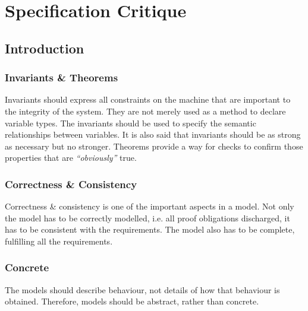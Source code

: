 
\def\mytitle{Specification Critique}
\def\myauthor{Group 03}
\def\email{se2020.grp03@cse.unsw.edu.au}
\def\mydate{05 August 2012}
\def\latexmode{article}

 \pagebreak 

 \tableofcontents 

 \pagebreak 

\chapter{Specification Critique}
\label{specificationcritique}

\section{Introduction}
\label{introduction}

\subsection{Invariants \& Theorems}
\label{invariantstheorems}

Invariants should express all constraints on the machine that are important to the integrity of the system. They are not merely used as a method to declare variable types. The invariants should be used to specify the semantic relationships between variables. It is also said that invariants should be as strong as necessary but no stronger. Theorems provide a way for checks to confirm those properties that are \emph{``obviously''} true. 

\subsection{Correctness \& Consistency}
\label{correctnessconsistency}

Correctness \& consistency is one of the important aspects in a model. Not only the model has to be correctly modelled, i.e. all proof obligations discharged, it has to be consistent with the requirements. The model also has to be complete, fulfilling all the requirements.

\subsection{Concrete}
\label{concrete}

The models should describe behaviour, not details of how that behaviour is obtained. Therefore, models should be abstract, rather than concrete.

